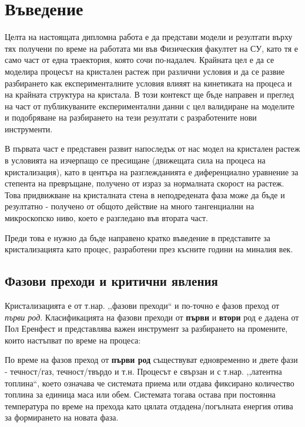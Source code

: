 \setcounter{page}{2}
\section{Въведение}
Целта на настоящата дипломна работа е да представи модели и резултати върху тях получени по време на работата ми във Физическия факултет на СУ, като тя е само част от една траектория, която сочи по-надалеч. Крайната цел е да се моделира процесът на кристален растеж при различни условия и да се развие разбирането как експерименталните условия влияят на кинетиката на процеса и на крайната структура на кристала. В този контекст ще бъде направен и преглед на част от публикуваните експериментални данни с цел валидиране на моделите и подобряване на разбирането на тези резултати с разработените нови инструменти.

В първата част е представен развит напоследък от нас модел на кристален растеж в условията на изчерпащо се пресищане (движещата сила на процеса на кристализация), като в центъра на разглежданията е диференциално уравнение за степента на превръщане, получено от израз за нормалната скорост на растеж. Това придвижване на кристалната стена в неподредената фаза може да бъде и резултатно - получено от общото действие на много тангенциални на микроскопско ниво, което е разгледано във втората част. 

Преди това е нужно да бъде направено кратко въведение в представите за кристализацията като процес, разработени през късните години на миналия век.

\subsection{Фазови преходи и критични явления}
Кристализацията е от т.нар. ,,фазови преходи`` и по-точно е фазов преход от \textit{първи род}. Класификацията на фазови преходи от \textbf{първи} и \textbf{втори} род е дадена от Пол Еренфест \cite{Jaeger1998} \cite{atkinspaula2008} и представлява важен инструмент за разбирането на промените, които настъпват по време на процеса:

По време на фазов преход от \textbf{първи род} съществуват едновременно и двете фази - течност/газ, течност/твърдо и т.н. Процесът е свързан и с т.нар. ,,латентна топлина``, което означава че системата приема или отдава фиксирано количество топлина за единица маса или обем. Системата тогава остава при постоянна температура по време на прехода като цялата отдадена/погълната енергия отива за формирането на новата фаза.

